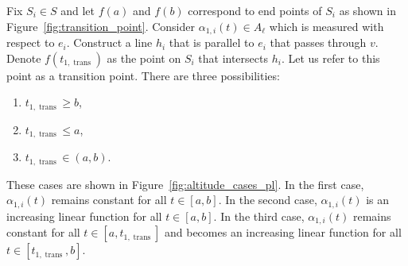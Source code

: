 \documentclass[../main.tex]{subfiles}
\begin{document}
Fix $S_i\in S$ and let $f(a)$ and $f(b)$ correspond to end points of $S_i$ as shown in Figure~\ref{fig:transition_point}. Consider $\alpha_{1,i}(t)\in A_{\ell}$ which is measured with respect to $e_i$. Construct a line $h_{i}$ that is parallel to $e_i$ that passes through $v$. Denote $f(t_{1,\operatorname{trans}})$ as the point on $S_i$ that intersects $h_i$. Let us refer to this point as a transition point. There are three possibilities:
\begin{enumerate}
	\item $t_{1,\operatorname{trans}}\geq b$,
	\item $t_{1,\operatorname{trans}}\leq a$,
	\item $t_{1,\operatorname{trans}}\in(a,b)$.
\end{enumerate} 
These cases are shown in Figure~\ref{fig:altitude_cases_pl}. In the first case, $\alpha_{1,i}(t)$ remains constant for all $t\in[a,b]$. In the second case, $\alpha_{1,i}(t)$ is an increasing linear function for all $t\in[a,b]$. In the third case, $\alpha_{1,i}(t)$ remains constant for all $t\in[a,t_{1,\operatorname{trans}}]$ and becomes an increasing linear function for all $t\in[t_{1,\operatorname{trans}},b]$.

\end{document}
